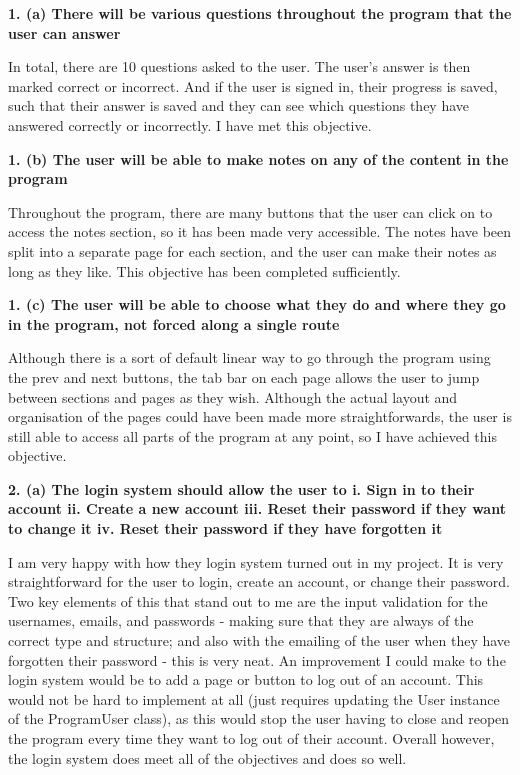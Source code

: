 \documentclass{article}
\begin{document}
\textbf{1. (a) There will be various questions throughout the program that the user can answer}

In total, there are 10 questions asked to the user. The user's answer is then marked correct or incorrect. And if the user is signed in, their progress is saved, such that their answer is saved and they can see which questions they have answered correctly or incorrectly. I have met this objective.


\textbf{1. (b) The user will be able to make notes on any of the content in the program}

Throughout the program, there are many buttons that the user can click on to access the notes section, so it has been made very accessible. The notes have been split into a separate page for each section, and the user can make their notes as long as they like. This objective has been completed sufficiently.


\textbf{1. (c) The user will be able to choose what they do and where they go in the program, not forced along a single route}

Although there is a sort of default linear way to go through the program using the prev and next buttons, the tab bar on each page allows the user to jump between sections and pages as they wish. Although the actual layout and organisation of the pages could have been made more straightforwards, the user is still able to access all parts of the program at any point, so I have achieved this objective.

\textbf{2. (a) The login system should allow the user to i. Sign in to their account ii. Create a new account iii. Reset their password if they want to change it iv. Reset their password if they have forgotten it}

I am very happy with how they login system turned out in my project. It is very straightforward for the user to login, create an account, or change their password. Two key elements of this that stand out to me are the input validation for the usernames, emails, and passwords - making sure that they are always of the correct type and structure; and also with the emailing of the user when they have forgotten their password - this is very neat. An improvement I could make to the login system would be to add a page or button to log out of an account. This would not be hard to implement at all (just requires updating the User instance of the ProgramUser class), as this would stop the user having to close and reopen the program every time they want to log out of their account. Overall however, the login system does meet all of the objectives and does so well.
\end{document}
